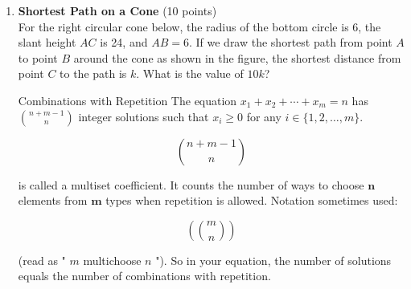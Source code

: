 \begin{enumerate}
  \newpage

  \item \textbf{Shortest Path on a Cone} (10 points)\\
  For the right circular cone below, the radius of the bottom circle is 6, 
  the slant height $AC$ is 24, and $AB=6$. If we draw the shortest path 
  from point $A$ to point $B$ around the cone as shown in the figure, the 
  shortest distance from point $C$ to the path is $k$. What is the value 
  of $10k$?

  \begin{subanswer}
  \end{subanswer}

  \begin{define}{Combinations with Repetition}
    The equation $x_1+x_2+\cdots+x_m=n$ has $\binom{n+m-1}{n}$ integer solutions such that $x_i \geq 0$ for any $i \in\{1,2, \ldots, m\}$.
  \end{define}



  $$
\binom{n+m-1}{n}
$$

is called a multiset coefficient.
It counts the number of ways to choose $\mathbf{n}$ elements from $\mathbf{m}$ types when repetition is allowed.
Notation sometimes used:

$$
\left(\binom{m}{n}\right)
$$

(read as " $m$ multichoose $n$ ").
So in your equation, the number of solutions equals the number of combinations with repetition.
  
\end{enumerate}

